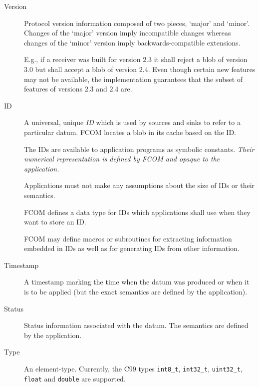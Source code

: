 \documentclass[11pt]{article}
\newcommand{\fcom}{FCOM}
\newcommand{\blob}{blob}
\begin{document}
      \begin{description}
		\item[Version] Protocol version information composed
              of two pieces, `major' and `minor'. Changes of the
              `major' version imply incompatible changes whereas
              changes of the `minor' version imply backwards-compatible
              extensions.

              E.g., if a receiver was built for version $2.3$ it
              shall reject a \blob{} of version $3.0$ but shall
              accept a \blob{} of version $2.4$. Even though
              certain new features may not be available, the
              implementation guarantees that the subset of
              features of versions $2.3$ and $2.4$ are.

        \item[ID] A universal, unique {\em ID} which is used by 
              sources and sinks to refer to a particular datum.
              \fcom{} locates a \blob{} in its cache based on the ID.

              The IDs are available to application programs as 
              symbolic constants. {\em Their numerical representation
              is defined by \fcom{} and opaque to the application.}

              Applications must not make any assumptions about
              the size of IDs or their semantics.

              \fcom{} defines a data type for IDs which applications
              shall use when they want to store an ID.

              \fcom{} may define macros or subroutines for extracting
              information embedded in IDs as well as for generating
              IDs from other information.

        \item[Timestamp] A timestamp marking the time when the
              datum was produced or when it is to be applied
              (but the exact semantics are defined by the application).

        \item[Status] Status information associated with the datum.
              The semantics are defined by the application.

        \item[Type] An element-type. Currently, the C99 types
              {\tt int8\_t}, {\tt int32\_t}, {\tt uint32\_t}, {\tt float} and
              {\tt double} are supported.


\end{description}
\end{document}
